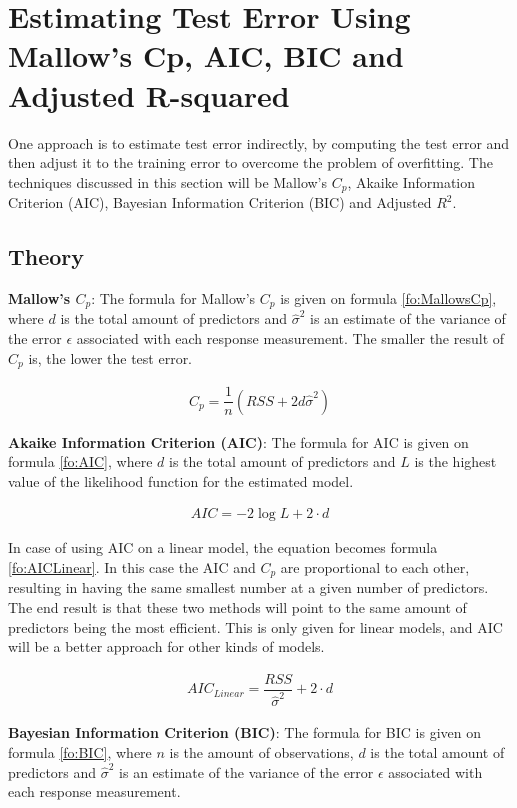 \section{Estimating Test Error Using Mallow's Cp, AIC, BIC and Adjusted R-squared}
One approach is to estimate test error indirectly, by computing the test error and then adjust it to the training error to overcome the problem of overfitting. The techniques discussed in this section will be Mallow's $C_p$, Akaike Information Criterion (AIC), Bayesian Information Criterion (BIC) and Adjusted $R^2$.

\subsection{Theory}
\textbf{Mallow's $C_p$}: The formula for Mallow's $C_p$ is given on formula \ref{fo:MallowsCp}, where $d$ is the total amount of predictors and $\hat{\sigma}^2$ is an estimate of the variance of the error $\epsilon$ associated with each response measurement. The smaller the result of $C_p$ is, the lower the test error. 

\begin{align}\label{fo:MallowsCp}
	C_p = \dfrac{1}{n} (RSS + 2 d \hat{\sigma}^2)
\end{align}

\textbf{Akaike Information Criterion (AIC)}: The formula for AIC is given on formula \ref{fo:AIC}, where $d$ is the total amount of predictors and $L$ is the highest value of the likelihood function for the estimated model.

\begin{align}\label{fo:AIC}
	AIC = -2 \log L + 2 \cdot d
\end{align}

In case of using AIC on a linear model, the equation becomes formula \ref{fo:AICLinear}. In this case the AIC and $C_p$ are proportional to each other, resulting in having the same smallest number at a given number of predictors. The end result is that these two methods will point to the same amount of predictors being the most efficient. This is only given for linear models, and AIC will be a better approach for other kinds of models.
 
\begin{align}\label{fo:AICLinear}
	AIC_{Linear} = \dfrac{RSS}{\hat{\sigma}^2} + 2 \cdot d
\end{align}

\textbf{Bayesian Information Criterion (BIC)}: The formula for BIC is given on formula \ref{fo:BIC}, where $n$ is the amount of observations, $d$ is the total amount of predictors and $\hat{\sigma}^2$ is an estimate of the variance of the error $\epsilon$ associated with each response measurement.

